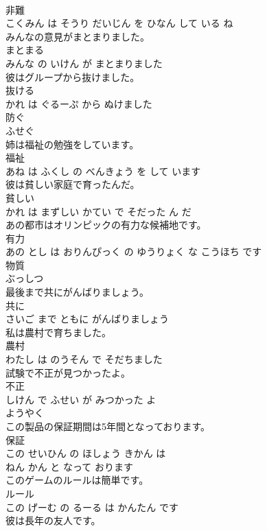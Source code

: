\documentclass[8pt]{extreport}
\begin{document}
\begin{CJK}{UTF8}{min}
\\	非難 
\\	こくみん は そうり だいじん を ひなん して いる ね			
\\	みんなの意見がまとまりました。	
\\	まとまる 
\\	みんな の いけん が まとまりました			
\\	彼はグループから抜けました。	
\\	抜ける 
\\	かれ は ぐるーぷ から ぬけました			
\\	防ぐ	
\\	ふせぐ			
\\	姉は福祉の勉強をしています。	
\\	福祉 
\\	あね は ふくし の べんきょう を して います			
\\	彼は貧しい家庭で育ったんだ。	
\\	貧しい 
\\	かれ は まずしい かてい で そだった ん だ			
\\	あの都市はオリンピックの有力な候補地です。	
\\	有力 
\\	あの とし は おりんぴっく の ゆうりょく な こうほち です			
\\	物質	
\\	ぶっしつ			
\\	最後まで共にがんばりましょう。	
\\	共に 
\\	さいご まで ともに がんばりましょう			
\\	私は農村で育ちました。	
\\	農村 
\\	わたし は のうそん で そだちました			
\\	試験で不正が見つかったよ。	
\\	不正 
\\	しけん で ふせい が みつかった よ			
\\	ようやく	
\\	この製品の保証期間は5年間となっております。	
\\	保証 
\\	この せいひん の ほしょう きかん は 
\\	ねん かん と なって おります			
\\	このゲームのルールは簡単です。	
\\	ルール 
\\	この げーむ の るーる は かんたん です			
\\	彼は長年の友人です。	

\end{CJK}
\end{document}
